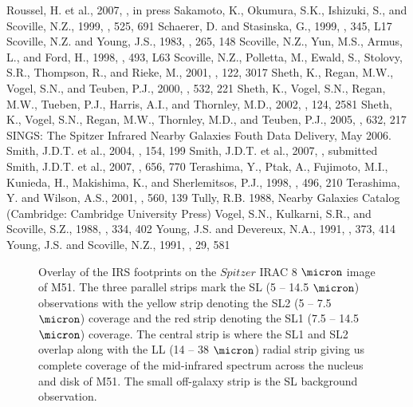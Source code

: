 \documentclass[manuscript]{aastex}
\begin{document}
\begin{thebibliography}{}
 Roussel, H. et al., 2007, \apjs, in press
 Sakamoto, K., Okumura, S.K., Ishizuki, S., and Scoville, N.Z., 1999, \apj, 525, 691
 Schaerer, D. and Stasinska, G., 1999, \aap, 345, L17
 Scoville, N.Z. and Young, J.S., 1983, \aj, 265, 148
 Scoville, N.Z., Yun, M.S., Armus, L., and Ford, H., 1998, \apj, 493, L63 
 Scoville, N.Z., Polletta, M., Ewald, S., Stolovy, S.R., Thompson, R., and Rieke, M., 2001, \aj, 122, 3017
 Sheth, K., Regan, M.W., Vogel, S.N., and Teuben, P.J., 2000, \apj, 532, 221 
 Sheth, K., Vogel, S.N., Regan, M.W., Tueben, P.J., Harris, A.I., and Thornley, M.D., 2002, \aj, 124, 2581
 Sheth, K., Vogel, S.N., Regan, M.W., Thornley, M.D., and Teuben, P.J., 2005, \apj, 632, 217
 SINGS: The Spitzer Infrared Nearby Galaxies Fouth Data Delivery, May 2006.
 Smith, J.D.T. et al., 2004, \apjs, 154, 199
 Smith, J.D.T. et al., 2007, \pasp, submitted
 Smith, J.D.T. et al., 2007, \apj, 656, 770
 Terashima, Y., Ptak, A., Fujimoto, M.I., Kunieda, H., Makishima, K., and Sherlemitsos, P.J., 1998, \apj, 496, 210
 Terashima, Y. and Wilson, A.S., 2001, \apj, 560, 139
 Tully, R.B. 1988, Nearby Galaxies Catalog (Cambridge: Cambridge University Press)
 Vogel, S.N., Kulkarni, S.R., and Scoville, S.Z., 1988, \nat, 334, 402
 Young, J.S. and Devereux, N.A., 1991, \apj, 373, 414
 Young, J.S. and Scoville, N.Z., 1991, \araa, 29, 581
\end{thebibliography}

\clearpage

\begin{figure}
\caption{Overlay of the IRS footprints on the $Spitzer$ IRAC 8 $\micron$ image of M51.  
The three parallel strips mark the SL (5 -- 14.5 $\micron$) observations with the yellow 
strip denoting the SL2 (5 -- 7.5 $\micron$) coverage and the red strip 
denoting the SL1 (7.5 -- 14.5 $\micron$) coverage.  The central strip is where the SL1
and SL2 overlap along with the LL (14 -- 38 $\micron$) radial strip giving us complete coverage of the 
mid-infrared spectrum across the nucleus and disk of M51.  
The small off-galaxy strip is the SL background observation.}
\label{figure-1}
\end{figure}
\end{document}

